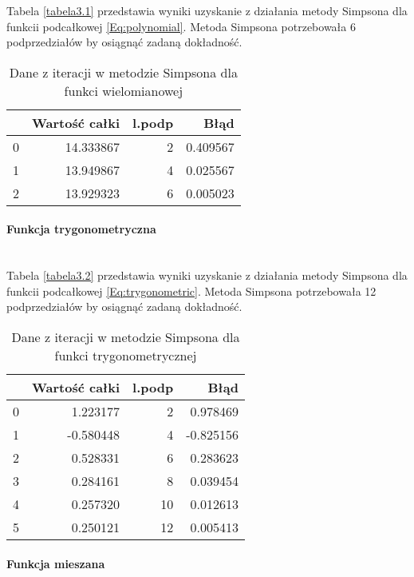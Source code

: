 \documentclass[12pt,twoside]{article}
\begin{document}
Tabela \eqref{tabela3.1} przedstawia wyniki uzyskanie z działania metody Simpsona dla funkcii podcałkowej \eqref{Eq:polynomial}. Metoda Simpsona potrzebowała 6 podprzedziałów by osiągnąć zadaną dokładność.

\begin{table}[H]
\centering 
\caption{Dane z iteracji w metodzie Simpsona dla funkci wielomianowej}
\label{tabela3.1}
\begin{tabular}{lrrr}
\toprule
{} &  Wartość całki &  l.podp &      Błąd \\
\midrule
0 &      14.333867 &       2 &  0.409567 \\
1 &      13.949867 &       4 &  0.025567 \\
2 &      13.929323 &       6 &  0.005023 \\
\bottomrule
\end{tabular}
\end{table}

\paragraph{Funkcja trygonometryczna}\mbox{} \\

Tabela \eqref{tabela3.2} przedstawia wyniki uzyskanie z działania metody Simpsona dla funkcii podcałkowej \eqref{Eq:trygonometric}. Metoda Simpsona potrzebowała 12 podprzedziałów by osiągnąć zadaną dokładność.

\begin{table}[H]
\centering
\caption{Dane z iteracji w metodzie Simpsona dla funkci trygonometrycznej}
\label{tabela3.2}
\begin{tabular}{lrrr}
\toprule
{} &  Wartość całki &  l.podp &      Błąd \\
\midrule
0 &       1.223177 &       2 &  0.978469 \\
1 &      -0.580448 &       4 & -0.825156 \\
2 &       0.528331 &       6 &  0.283623 \\
3 &       0.284161 &       8 &  0.039454 \\
4 &       0.257320 &      10 &  0.012613 \\
5 &       0.250121 &      12 &  0.005413 \\
\bottomrule
\end{tabular}
\end{table}


\paragraph{Funkcja mieszana}\mbox{} \\
\end{document}
